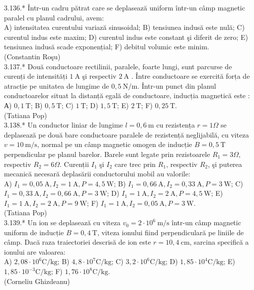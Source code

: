 \documentclass[10pt]{article}
\begin{document}
3.136.* Într-un cadru pătrat care se deplasează uniform într-un câmp magnetic paralel cu planul cadrului, avem:\\ A) intensitatea curentului variază sinusoidal; B) tensiunea indusă este nulă; C) curentul indus este maxim; D) curentul indus este constant şi diferit de zero; E) tensiunea indusă scade exponențial; F) debitul volumic este minim.\\ (Constantin Roşu)\\

3.137.* Două conductoare rectilinii, paralele, foarte lungi, sunt parcurse de curenți de intensități $1 \mathrm{~A}$ şi respectiv $2 \mathrm{~A}$ . Între conductoare se exercită forța de atracție pe unitatea de lungime de $0,5 \mathrm{~N} / \mathrm{m}$. Într-un punct din planul conductoarelor situat la distanță egală de conductoare, inducția magnetică este :\\ А) $0,1 \mathrm{~T}$; B) $0,5 \mathrm{~T}$; C) $1 \mathrm{~T}$; D) $1,5 \mathrm{~T}$; E) $2 \mathrm{~T}$; F) $0,25 \mathrm{~T}$.\\ (Tatiana Pop)\\

3.138.* Un conductor liniar de lungime $l=0,6 \mathrm{~m}$ cu rezistența $r=1 \Omega$ se deplasează pe două bare conductoare paralele de rezistență neglijabilă, cu viteza $v=10 \mathrm{~m} / \mathrm{s}$, normal pe un câmp magnetic omogen de inducție $B=0,5 \mathrm{~T}$ perpendicular pe planul barelor. Barele sunt legate prin rezistoarele $R_{1}=3 \Omega$, respectiv $R_{2}=6 \Omega$. Curenții $I_{1}$ şi $I_{2}$ care trec prin $R_{1}$, respectiv $R_{2}$, şi puterea mecanică necesară deplasării conductorului mobil au valorile:\\ A) $I_{1}=0,05 \mathrm{~A}, I_{2}=1 \mathrm{~A}, P=4,5 \mathrm{~W}$; B) $I_{1}=0,66 \mathrm{~A}, I_{2}=0,33 \mathrm{~A}, P=3 \mathrm{~W}$; C) $I_{1}=0,33 \mathrm{~A}, I_{2}=0,66 \mathrm{~A}, P=3 \mathrm{~W}$; D) $I_{1}=1 \mathrm{~A}, I_{2}=2 \mathrm{~A}, P=4,5 \mathrm{~W}$; E) $I_{1}=1 \mathrm{~A}, I_{2}=2 \mathrm{~A}, P=9 \mathrm{~W}$; F) $I_{1}=1 \mathrm{~A}, I_{2}=0,05 \mathrm{~A}, P=3 \mathrm{~W}$.\\ (Tatiana Pop)\\

3.139.* Un ion se deplasează cu viteza $v_{0}=2 \cdot 10^{6} \mathrm{~m} / \mathrm{s}$ într-un câmp magnetic uniform de inducție $B=0,4 \mathrm{~T}$, viteza ionului fiind perpendiculară pe liniile de câmp. Dacă raza traiectoriei descrisă de ion este $r=10,4 \mathrm{~cm}$, sarcina specifică a ionului are valoarea:\\ A) $2,08 \cdot 10^{6} \mathrm{C} / \mathrm{kg}$; B) $4,8 \cdot 10^{7} \mathrm{C} / \mathrm{kg}$; C) $3,2 \cdot 10^{6} \mathrm{C} / \mathrm{kg}$; D) $1,85 \cdot 10^{4} \mathrm{C} / \mathrm{kg}$; E) $1,85 \cdot 10^{-3} \mathrm{C} / \mathrm{kg}$; F) $1,76 \cdot 10^{8} \mathrm{C} / \mathrm{kg}$.\\ (Corneliu Ghizdeanu)\\
\end{document}
